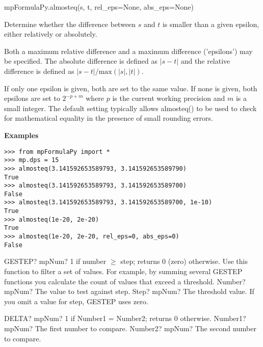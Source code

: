 \vspace{0.3cm}


mpFormulaPy.almosteq(s, t, rel\_eps=None, abs\_eps=None)

\vpara
Determine whether the difference between $s$ and $t$ is smaller than a given epsilon, either relatively or absolutely.

\vpara
Both a maximum relative difference and a maximum difference ('epsilons') may be specified. The absolute difference is defined as $|s-t|$ and the relative difference is defined as $|s-t|/\text{max}(|s|,|t|)$.

\vpara
If only one epsilon is given, both are set to the same value. If none is given, both epsilons are set to $2^{-p+m}$ where $p$ is the current working precision and $m$ is a small integer. The default setting typically allows almosteq() to be used to check for mathematical equality in the presence of small rounding errors.

\vpara
\textbf{Examples}

\begin{lstlisting}
>>> from mpFormulaPy import *
>>> mp.dps = 15
>>> almosteq(3.141592653589793, 3.141592653589790)
True
>>> almosteq(3.141592653589793, 3.141592653589700)
False
>>> almosteq(3.141592653589793, 3.141592653589700, 1e-10)
True
>>> almosteq(1e-20, 2e-20)
True
>>> almosteq(1e-20, 2e-20, rel_eps=0, abs_eps=0)
False
\end{lstlisting}



\vspace{0.6cm}

\begin{mpFunctionsExtract}
	\mpWorksheetFunctionTwoNotImplemented
	{GESTEP? mpNum?  1 if number $\geq$ step; returns 0 (zero) otherwise. Use this function to filter a set of values. For example, by summing several GESTEP functions you calculate the count of values that exceed a threshold.}
	{Number? mpNum? The value to test against step.}
	{Step? mpNum? The threshold value. If you omit a value for step, GESTEP uses zero.}
\end{mpFunctionsExtract}



\vspace{0.6cm}

\begin{mpFunctionsExtract}
	\mpWorksheetFunctionTwoNotImplemented
	{DELTA? mpNum?  1 if Number1 = Number2; returns 0 otherwise.}
	{Number1? mpNum? The first number to compare.}
	{Number2? mpNum? The second number to compare.}
\end{mpFunctionsExtract}

